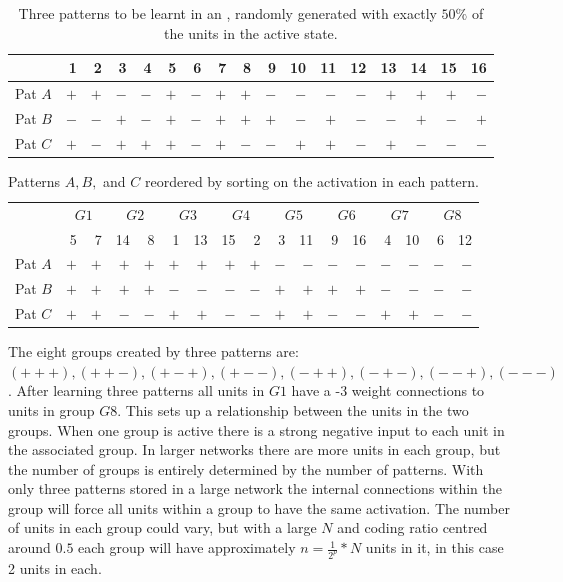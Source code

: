 \begin{table}[htbp]
\center
	\begin{small}
		\begin{tabular}{l|*{16}{r}}
			&1  &2  &3  &4  &5  &6  &7  &8  &9  &10 &11 &12 &13 &14 &15 &16 \\      
	\hline
		Pat $A$	&$+$&$+$&$-$&$-$&$+$&$-$&$+$&$+$&$-$&$-$&$-$&$-$&$+$&$+$&$+$&$-$ \\     
		Pat $B$	&$-$&$-$&$+$&$-$&$+$&$-$&$+$&$+$&$+$&$-$&$+$&$-$&$-$&$+$&$-$&$+$ \\     
		Pat $C$	&$+$&$-$&$+$&$+$&$+$&$-$&$+$&$-$&$-$&$+$&$+$&$-$&$+$&$-$&$-$&$-$ \\     
		\end{tabular}
	\end{small}
	\caption{Three patterns to be learnt in an , randomly generated with exactly $50\%$ of the units in the active state.}
	\label{tab:PatsH16}
\end{table}

\begin{table}[htbp]
\center
	\begin{footnotesize}
		\begin{tabular}{l*{8}{|rr}|}
						&
						&
						&
						&
						&
						&
						&
						&\\
						&5&7&14&8&1&13&15&2&3&11&9&16&4&10&6&12\\
						\hline
		Pat $A$	& $+$&$+$&$+$&$+$&$+$&$+$&$+$&$+$&$-$&$-$&$-$&$-$&$-$&$-$&$-$&$-$ \\
		Pat $B$	& $+$&$+$&$+$&$+$&$-$&$-$&$-$&$-$&$+$&$+$&$+$&$+$&$-$&$-$&$-$&$-$ \\
		Pat $C$	& $+$&$+$&$-$&$-$&$+$&$+$&$-$&$-$&$+$&$+$&$-$&$-$&$+$&$+$&$-$&$-$ \\
		\end{tabular}
	\end{footnotesize}
	\caption{Patterns $A, B,$ and $C$ reordered by sorting on the activation in each pattern.}
	\label{tab:PatsH16Sorted}
\end{table}

The eight groups created by three patterns are: {\footnotesize $(+++), (++-), (+-+), (+--), (-++), (-+-), (--+), (---)$}. After learning three patterns all units in $G1$ have a -3 weight connections to units in group $G8$.  This sets up a relationship between the units in the two groups.  When one group is active there is a strong negative input to each unit in the associated group. In larger networks there are more units in each group, but the number of groups is entirely determined by the number of patterns. With only three patterns stored in a large network the internal connections within the group will force all units within a group to have the same activation. The number of units in each group could vary, but with a large $N$ and coding ratio centred around $0.5$ each group will have approximately $n=\frac{1}{2^{p}}*N$ units in it, in this case 2 units in each.

